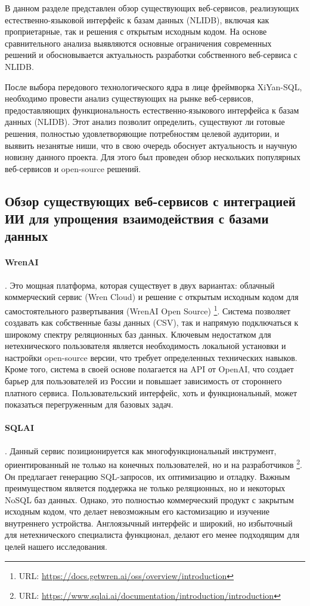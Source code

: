 \begin{annotation}
      В данном разделе представлен обзор существующих веб-сервисов, реализующих естественно-языковой
      интерфейс к базам данных (NLIDB), включая как проприетарные, так и решения с открытым исходным кодом.
      На основе сравнительного анализа выявляются основные
      ограничения современных решений и обосновывается актуальность
      разработки собственного веб-сервиса с NLIDB.
\end{annotation}

После выбора передового технологического ядра в лице фреймворка XiYan-SQL,
необходимо провести анализ существующих на рынке веб-сервисов, предоставляющих
функциональность естественно-языкового интерфейса к базам данных (NLIDB).
Этот анализ позволит определить, существуют ли готовые решения, полностью
удовлетворяющие потребностям целевой аудитории, и выявить незанятые ниши,
что в свою очередь обоснует актуальность и научную новизну данного проекта.
Для этого был проведен обзор нескольких популярных веб-сервисов и
open-source решений.

\subsection{Обзор существующих веб-сервисов с интеграцией ИИ для упрощения
      взаимодействия с базами данных}

\paragraph{WrenAI}. Это мощная платформа, которая существует в двух вариантах:
облачный коммерческий сервис (Wren Cloud) и решение с открытым исходным кодом
для самостоятельного развертывания (WrenAI Open Source)
\footnote{URL: \url{https://docs.getwren.ai/oss/overview/introduction}}.
Система позволяет создавать как собственные базы данных (CSV), так и напрямую подключаться к
широкому спектру реляционных баз данных. Ключевым недостатком для нетехнического
пользователя является необходимость локальной установки и настройки open-source версии,
что требует определенных технических навыков. Кроме того, система в своей основе полагается
на API от OpenAI, что создает барьер для пользователей из России и повышает зависимость
от стороннего платного сервиса. Пользовательский интерфейс, хоть и функциональный, может
показаться перегруженным для базовых задач.

\paragraph{SQLAI}. Данный сервис позиционируется как многофункциональный инструмент,
ориентированный не только на конечных пользователей, но и на разработчиков
\footnote{URL: \url{https://www.sqlai.ai/documentation/introduction/introduction}}.
Он предлагает генерацию SQL-запросов, их оптимизацию и отладку. Важным преимуществом
является поддержка не только реляционных, но и некоторых NoSQL баз данных. Однако, это
полностью коммерческий продукт с закрытым исходным кодом, что делает невозможным его
кастомизацию и изучение внутреннего устройства. Англоязычный интерфейс и широкий, но
избыточный для нетехнического специалиста функционал, делают его менее подходящим для
целей нашего исследования.

